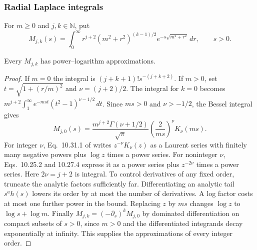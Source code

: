 \subsubsection{Radial Laplace integrals}
For $m\geq0$ and $j,k\in\mathbb N$, put
\[
 M_{j,k}(s)=\int_0^\infty r^{j+2}(m^2+r^2)^{(k-1)/2}
                         e^{-s\sqrt{m^2+r^2}}\,dr,\qquad s>0.
\]
\begin{proposition}\label{prop:profile-moments}
Every $M_{j,k}$ has power--logarithm approximations.
\end{proposition}
\begin{proof}
If $m=0$ the integral is $(j+k+1)!s^{-(j+k+2)}$. If $m>0$, set
$t=\sqrt{1+(r/m)^2}$ and $\nu=(j+2)/2$. The integral for $k=0$
becomes $m^{j+2}\int_1^\infty e^{-mst}(t^2-1)^{\nu-1/2}\,dt$.
Since $ms>0$ and $\nu>-1/2$, the Bessel integral
\cite[Eq.~10.32.8]{DLMF} gives
\[
 M_{j,0}(s)=\frac{m^{j+2}\Gamma(\nu+1/2)}{\sqrt\pi}
                    \left(\frac{2}{ms}\right)^\nu K_\nu(ms).
\]
For integer $\nu$, Eq.~10.31.1 of \cite{DLMF} writes
$z^{-\nu}K_\nu(z)$ as a Laurent series with finitely many negative
powers plus $\log z$ times a power series. For noninteger $\nu$,
Eqs.~10.25.2 and 10.27.4 express it as a power series plus
$z^{-2\nu}$ times a power series. Here $2\nu=j+2$ is integral.
To control derivatives of any fixed order, truncate the analytic
factors sufficiently far. Differentiating an analytic tail $s^a h(s)$
lowers its order by at most the number of derivatives. A log factor
costs at most one further power in the bound.
Replacing $z$ by $ms$ changes $\log z$ to $\log s+\log m$.
Finally $M_{j,k}=(-\partial_s)^k M_{j,0}$ by dominated differentiation
on compact subsets of $s>0$, since $m>0$ and the differentiated
integrands decay exponentially at infinity. This supplies the
approximations of every integer order.
\end{proof}

